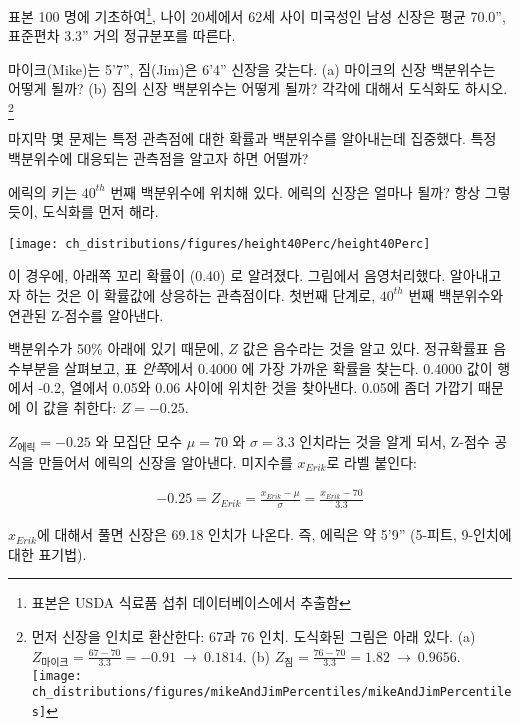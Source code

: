 표본 100 명에 기초하여\footnote{표본은 USDA 식료품 섭취 데이터베이스에서 추출함}, 나이 20세에서 62세 사이 미국성인 남성 신장은 평균 70.0'', 표준편차 3.3'' 거의 정규분포를 따른다.

\begin{exercise}
마이크(Mike)는 5'7'', 짐(Jim)은 6'4'' 신장을 갖는다. (a) 마이크의 신장 백분위수는 어떻게 될까? (b) 짐의 신장 백분위수는 어떻게 될까? 각각에 대해서 도식화도 하시오.
\footnote{먼저 신장을 인치로 환산한다: 67과 76 인치. 도식화된 그림은 아래 있다. (a) $Z_{마이크} = \frac{67 - 70}{3.3} = -0.91\ \to\ 0.1814$. (b) $Z_{짐} = \frac{76 - 70}{3.3} = 1.82\ \to\ 0.9656$. \\\texttt{[image: ch\_distributions/figures/mikeAndJimPercentiles/mikeAndJimPercentiles]}}
\end{exercise}

마지막 몇 문제는 특정 관측점에 대한 확률과 백분위수를 알아내는데 집중했다. 특정 백분위수에 대응되는 관측점을 알고자 하면 어떨까?

\begin{example}{에릭의 키는 $40^{th}$ 번째 백분위수에 위치해 있다. 에릭의 신장은 얼마나 될까?}\label{normalExam40Perc}
항상 그렇듯이, 도식화를 먼저 해라.\vspace{-1mm}
\begin{center}
\texttt{[image: ch\_distributions/figures/height40Perc/height40Perc]}\vspace{-1mm}
\end{center}
이 경우에, 아래쪽 꼬리 확률이 (0.40) 로 알려졌다. 그림에서 음영처리했다. 알아내고자 하는 것은 이 확률값에 상응하는 관측점이다. 첫번째 단계로, $40^{th}$ 번째 백분위수와 연관된 Z-점수를 알아낸다.

백분위수가 50\% 아래에 있기 때문에, $Z$ 값은 음수라는 것을 알고 있다. 정규확률표 음수부분을 살펴보고, 표 \emph{안쪽}에서 0.4000 에 가장 가까운 확률을 찾는다. 0.4000 값이 행에서 -0.2, 열에서 0.05와 0.06 사이에 위치한 것을 찾아낸다. 0.05에 좀더 가깝기 때문에 이 값을 취한다: $Z=-0.25$.

$Z_{에릭}=-0.25$ 와 모집단 모수 $\mu=70$ 와 $\sigma=3.3$ 인치라는 것을 알게 되서, Z-점수 공식을 만들어서 에릭의 신장을 알아낸다. 미지수를 $x_{Erik}$로 라벨 붙인다:

\begin{eqnarray*}
-0.25 = Z_{Erik} = \frac{x_{Erik} - \mu}{\sigma} = \frac{x_{Erik} - 70}{3.3}
\end{eqnarray*}

$x_{Erik}$에 대해서 풀면 신장은 69.18 인치가 나온다. 즉, 에릭은 약 5'9'' (5-피트, 9-인치에 대한 표기법).
\end{example}

